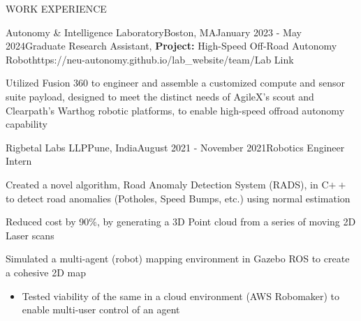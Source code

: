 \documentclass{resume} %
\begin{document}
\begin{rSection}{WORK EXPERIENCE}
\begin{rProjExpDetails}{Autonomy \& Intelligence Laboratory}{Boston, MA}{January 2023 - May 2024}{Graduate Research Assistant, \textbf{Project:} High-Speed Off-Road Autonomy Robot}{https://neu-autonomy.github.io/lab_website/team/}{Lab Link}
		\item Utilized Fusion 360 to engineer and assemble a customized compute and sensor suite payload, designed to meet the distinct needs of AgileX's scout and Clearpath's Warthog robotic platforms, to enable high-speed offroad autonomy capability
	\end{rProjExpDetails}

	\begin{rProjExpDetails}{Rigbetal Labs LLP}{Pune, India}{August 2021 - November 2021}{Robotics Engineer Intern}{}{}
		\item Created a novel algorithm, Road Anomaly Detection System (RADS), in C$++$ to detect road anomalies (Potholes, Speed Bumps, etc.) using normal estimation
		\item Reduced cost by 90\%, by generating a 3D Point cloud from a series of moving 2D Laser scans
		\item Simulated a multi-agent (robot) mapping environment in Gazebo ROS to create a cohesive 2D map
		\begin{itemize}
			\item Tested viability of the same in a cloud environment (AWS Robomaker) to enable multi-user control of an agent
		\end{itemize}
	\end{rProjExpDetails}


\end{rSection}
\end{document}
